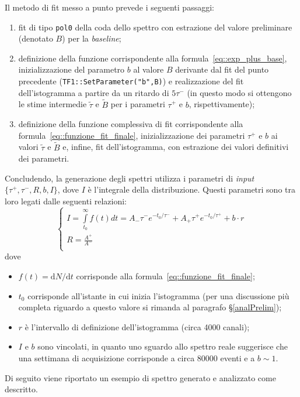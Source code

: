 \documentclass[10pt, oneside, a4paper]{article}   	%
\renewcommand{\d}{\mathrm{d}}
\begin{document}
Il metodo di fit messo a punto prevede i seguenti passaggi:
\begin{enumerate}
 \item fit di tipo \lstinline{pol0} della coda dello spettro con estrazione del valore preliminare (denotato $B$) per la \textit{baseline};
 \item definizione della funzione corrispondente alla formula~\ref{eq::exp_plus_base}, inizializzazione del parametro $b$ al valore $B$ derivante dal fit del punto precedente (\lstinline{TF1::SetParameter("b",B)}) e realizzazione del fit dell'istogramma a partire da un ritardo di $5\tau^-$ (in questo modo si ottengono le stime intermedie $\widetilde{\tau}$  e $\widetilde{B}$ per i parametri $\tau^+$ e $b$, rispettivamente);
 \item definizione della funzione complessiva di fit corrispondente alla formula~\ref{eq::funzione_fit_finale}, inizializzazione dei parametri $\tau^+$ e $b$ ai valori  $\widetilde{\tau}$ e $\widetilde{B}$ e, infine, fit dell'istogramma, con estrazione dei valori definitivi dei parametri. 
%
\end{enumerate}  
Concludendo, la generazione degli spettri utilizza i parametri di \textit{input} $\{\tau^+,\tau^-,R,b,I\}$, dove $I$ è l'integrale della distribuzione. Questi parametri sono tra loro legati dalle seguenti relazioni:
\begin{equation*}
  \begin{cases}
    I = \int\limits_{t_0}^\infty f(t)dt = A_-\tau^-e^{-t_0 / \tau^-} + A_+\tau^+e^{-t_0 / \tau^+} + b\cdot r \\
    R = \frac{A^+}{A^-} \\
  \end{cases}
  \label{eq::condizioni_parametri}
\end{equation*}
dove 
\begin{itemize}
 \item $f(t) = \d N/\d t$ corrisponde alla formula~\ref{eq::funzione_fit_finale};
 \item $t_0$ corrisponde all'istante in cui inizia l'istogramma (per una discussione più completa riguardo a questo valore si rimanda al paragrafo \S\ref{analPrelim});
 \item $r$ è l'intervallo di definizione dell'istogramma (circa 4000 canali);
 \item $I$ e $b$ sono vincolati, in quanto uno sguardo allo spettro reale suggerisce che una settimana di acquisizione corrisponde a circa 80000 eventi e a $b\sim1 $.
\end{itemize}
Di seguito viene riportato un esempio di spettro generato e analizzato come descritto.
\end{document}
